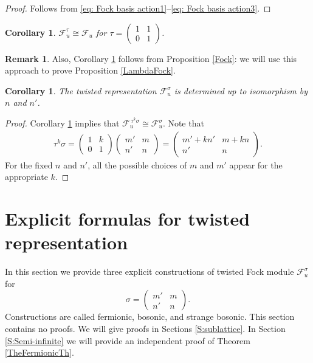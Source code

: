 \documentclass[pdftex]{sigma}
\numberwithin{equation}{section}
\newtheorem{Corollary}[Theorem]{Corollary}
\theoremstyle{definition}
\newtheorem{Remark}[Theorem]{Remark}
\begin{document}
\begin{proof}Follows from \eqref{eq: Fock basis action1}--\eqref{eq: Fock basis action3}.
\end{proof}

\begin{Corollary} \label{corol: unipotant twist}
$\mathcal{F}_u^{\tau} \cong \mathcal{F}_u$ for $\tau = \left( \begin{smallmatrix} 1 &1 \\ 0 & 1\end{smallmatrix} \right)$.
\end{Corollary}
\begin{Remark}
Also, Corollary \ref{corol: unipotant twist} follows from Proposition \ref{Fock}: we will use this approach to prove Proposition \ref{LambdaFock}.
\end{Remark}

\begin{Corollary} \label{corol: not m and m prime}
The twisted representation $\mathcal{F}_u^{\sigma}$ is determined up to isomorphism by $n$ and $n'$.
\end{Corollary}
\begin{proof}
Corollary \ref{corol: unipotant twist} implies that $\mathcal{F}_u^{\, \tau^k \sigma} \cong \mathcal{F}_u^{\sigma}$. Note that
\begin{gather*} \tau^k \sigma =
\begin{pmatrix}
1 & k \\
0 & 1
\end{pmatrix}
\begin{pmatrix}
m' & m \\
n' & n
\end{pmatrix}=
\begin{pmatrix}
m'+kn' & m+kn \\
n' & n
\end{pmatrix}.
\end{gather*}
For the fixed $n$ and $n'$, all the possible choices of $m$ and $m'$ appear for the appropriate $k$.
\end{proof}

\section{Explicit formulas for twisted representation} \label{Section with answers}
In this section we provide three explicit constructions of twisted Fock module $\mathcal{F}^\sigma_u$ for
\begin{equation} \label{sigma}
\sigma = \begin{pmatrix}m' & m \\
n' & n
\end{pmatrix}.
\end{equation}
Constructions are called fermionic, bosonic, and strange bosonic. This section contains no proofs. We will give proofs in Sections \ref{S:sublattice}. In Section \ref{S:Semi-infinite} we will provide an independent proof of Theorem \ref{TheFermionicTh}.
\end{document}
